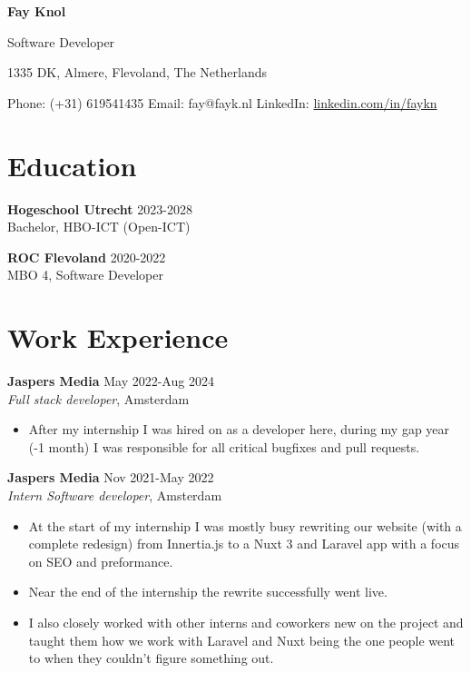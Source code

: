 \documentclass{article}
\begin{document}

\begin{center}
    \textbf{\Huge Fay Knol}

    Software Developer
    
    \vspace{5pt}
    
    1335 DK, Almere, Flevoland, The Netherlands
    
    \vspace{5pt}
    
    Phone: (+31) 619541435 \quad Email: fay@fayk.nl \quad LinkedIn: \href{https://www.linkedin.com/in/faykn}{linkedin.com/in/faykn}
\end{center}

\section*{Education}
\textbf{Hogeschool Utrecht} \hfill 2023-2028 \\
Bachelor, HBO-ICT (Open-ICT) \hfill

\textbf{ROC Flevoland} \hfill 2020-2022 \\
MBO 4, Software Developer \hfill

\section*{Work Experience}
\textbf{Jaspers Media} \hfill May 2022-Aug 2024 \\
\textit{Full stack developer}, Amsterdam \hfill
\begin{itemize}[noitemsep]
    \item After my internship I was hired on as a developer here, during my gap year (-1 month) I was responsible for all critical bugfixes and pull requests.
\end{itemize}
\textbf{Jaspers Media} \hfill Nov 2021-May 2022 \\
\textit{Intern Software developer}, Amsterdam \hfill
\begin{itemize}[noitemsep]
    \item At the start of my internship I was mostly busy rewriting our website (with a complete redesign) from Innertia.js to a Nuxt 3 and Laravel app with a focus on SEO and preformance.
    \item Near the end of the internship the rewrite successfully went live.
    \item I also closely worked with other interns and coworkers new on the project and taught them how we work with Laravel and Nuxt being the one people went to when they couldn't figure something out.
\end{itemize}
\end{document}
